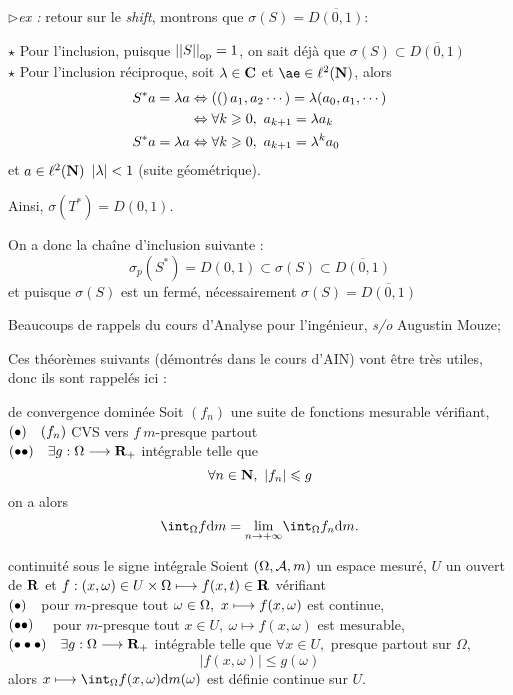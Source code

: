 \documentclass[a4paper,11pt, twoside]{article}
\begin{document}
$\triangleright$\emph{ex :} retour sur le \emph{shift}, montrons que $\sigma(S)=\overline{D(0,1)}$:


\begin{Proof}
  $\star$ Pour l'inclusion, puisque $\left|\left|S\right|\right|_{\mathrm{op}}=1$, on sait déjà que $\sigma(S)\subset\overline{D(0,1)}$\\

  $\star$ Pour l'inclusion réciproque, soit $\lambda\in\mathbf C$ et $æ\in\ell^2(\N)$, alors 
  \begin{align*}
    S^*a=\lambda a&\Leftrightarrow\Par(a_1,a_2\cdots)=\lambda(a_0,a_1,\cdots)\\
    &\Leftrightarrow \forall k\geqslant 0,\ a_{k+1}=\lambda a_k\\
    S^*a=\lambda a&\Leftrightarrow \forall k\geqslant 0,\ a_{k+1}=\lambda^k a_0
  \end{align*}
  et $a\in\ell^2(\mathbf N)$ \ssi $\left| \lambda\right|<1$ (suite géométrique).
  
  Ainsi, $\sigma(T^*)=D(0,1)$.

  On a donc la chaîne d'inclusion suivante : 
  $$\sigma_p(S^*)=D(0,1)\subset \sigma(S)\subset\overline{D(0,1)}$$
  et puisque $\sigma(S)$ est un fermé, nécessairement $\sigma(S)=\overline{D(0,1)}$
\end{Proof}





Beaucoups de rappels du cours d'Analyse pour l'ingénieur, \emph{s/o} Augustin Mouze;



Ces théorèmes suivants (démontrés dans le cours d'AIN) vont être très utiles, donc ils sont rappelés ici : 

\begin{thC}{de convergence dominée}
  Soit $(f_n)$ une suite de fonctions mesurable vérifiant,\\
  $(\bullet)\quad (f_n)$ CVS vers $f\ m$-presque partout\\
  $(\bullet\bullet)\quad \exists g:\Omega\longrightarrow\mathbf R_+$ intégrable telle que  
  $$\forall n\in\mathbf N,\ |f_n|\leqslant g$$
  on a alors $$\dstyle\int_{\O}f\mathrm dm = \underset{n\to+\infty}{\mathrm{lim}}\int_{\O}f_n\mathrm dm.$$
\end{thC}


\begin{thC}{continuité sous le signe intégrale}
  Soient $(\Omega,\mathcal A,m)$ un espace mesuré, $U$ un ouvert de $\mathbf R$ et $f:(x,\omega)\in U\times\Omega\longmapsto f(x,t)\in\mathbf R$ vérifiant\\
  $(\bullet)\quad$pour $m$-presque tout $\omega\in\Omega,\ x\longmapsto f(x,\omega)$ est continue,\\
  $(\bullet\bullet)\quad$ pour $m$-presque tout $x\in U,\ \omega\longmapsto f(x,\omega)$ est mesurable,\\
  $(\bullet\bullet\bullet)\quad\exists g:\Omega\longrightarrow\mathbf R_+$ intégrable telle que $\forall x\in U,$ presque partout sur $\Omega,$ $$|f(x,\omega)|\leqslant g(\omega)$$
  alors $x\longmapsto\dstyle\int_{\O}f(x,\omega)\mathrm{d}m(\omega)$ est définie continue sur $U$.
\end{thC}
    
\end{document}

